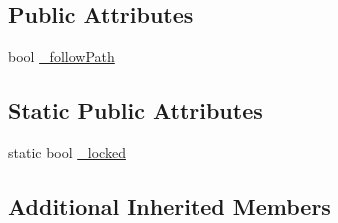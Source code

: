 \subsection*{Public Attributes}
\begin{DoxyCompactItemize}
\item 
bool \hyperlink{class_player_a8e8d189f49c664445fba0976115bb030}{\-\_\-follow\-Path}
\end{DoxyCompactItemize}
\subsection*{Static Public Attributes}
\begin{DoxyCompactItemize}
\item 
static bool \hyperlink{class_player_a39c12b1c083f02ba270fd7c2c4d48e42}{\-\_\-locked}
\end{DoxyCompactItemize}
\subsection*{Additional Inherited Members}


